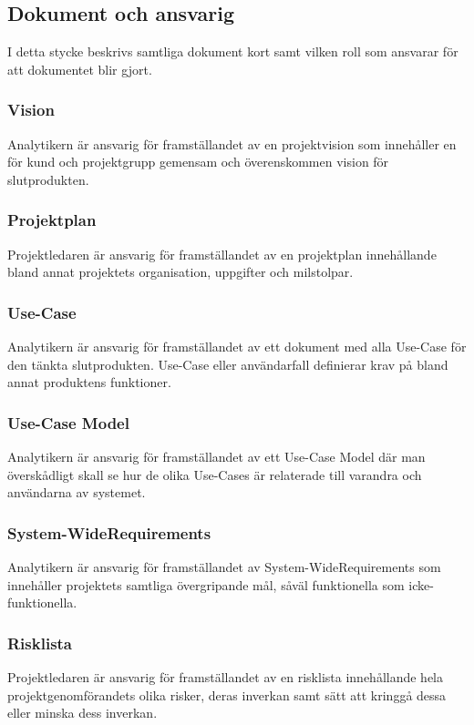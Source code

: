 \subsection{Dokument och ansvarig}
I detta stycke beskrivs samtliga dokument kort samt vilken roll som ansvarar för att dokumentet blir gjort.

\subsubsection{Vision}
Analytikern är ansvarig för framställandet av en projektvision som innehåller en för kund och projektgrupp gemensam och överenskommen vision för slutprodukten.

\subsubsection{Projektplan}
Projektledaren är ansvarig för framställandet av en projektplan innehållande bland annat projektets organisation, uppgifter och milstolpar.

\subsubsection{Use-Case}
Analytikern är ansvarig för framställandet av ett dokument med alla Use-Case för den tänkta slutprodukten. Use-Case eller användarfall definierar krav på bland annat produktens funktioner.

\subsubsection{Use-Case Model}
Analytikern är ansvarig för framställandet av ett Use-Case Model där man överskådligt skall se hur de olika Use-Cases är relaterade till varandra och användarna av systemet.

\subsubsection{System-WideRequirements}
Analytikern är ansvarig för framställandet av System-WideRequirements som innehåller projektets samtliga övergripande mål, såväl funktionella som icke-funktionella.

\subsubsection{Risklista}
Projektledaren är ansvarig för framställandet av en risklista innehållande hela projektgenomförandets olika risker, deras inverkan samt sätt att kringgå dessa eller minska dess inverkan.

